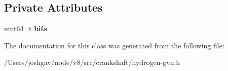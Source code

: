\subsection*{Private Attributes}
\begin{DoxyCompactItemize}
\item 
uint64\+\_\+t {\bfseries bits\+\_\+}\hypertarget{classv8_1_1internal_1_1_side_effects_afe67a874d91c216884f979e0238a131b}{}\label{classv8_1_1internal_1_1_side_effects_afe67a874d91c216884f979e0238a131b}

\end{DoxyCompactItemize}


The documentation for this class was generated from the following file\+:\begin{DoxyCompactItemize}
\item 
/\+Users/joshgav/node/v8/src/crankshaft/hydrogen-\/gvn.\+h\end{DoxyCompactItemize}
